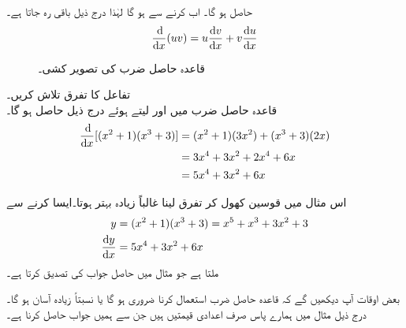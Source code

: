 حاصل ہو گا۔ اب   کرنے سے  ہو گا لہٰذا درج ذیل باقی رہ جاتا ہے۔
\begin{align*}
\frac{\dif}{\dif x}(uv)=u\frac{\dif v}{\dif x}+v\frac{\dif u}{\dif x}
\end{align*} 
%
\begin{figure}
\centering
{}
\caption{قاعدہ حاصل ضرب کی تصویر کشی۔}
\label{شکل_تفرق_قاعدہ_ضرب_تصور_کشی}
\end{figure}

تفاعل  کا تفرق تلاش کریں۔\\
قاعدہ حاصل ضرب میں  اور  لیتے ہوئے درج ذیل حاصل ہو گا۔
\begin{align*}
\frac{\dif}{\dif x}[(x^2+1)(x^3+3)]&=(x^2+1)(3x^2)+(x^3+3)(2x)\\
&=3x^4+3x^2+2x^4+6x\\
&=5x^4+3x^2+6x
\end{align*}
 
اس مثال میں  قوسین کھول کر تفرق لینا غالباً زیادہ بہتر ہوتا۔ایسا کرنے سے
\begin{align*}
y&=(x^2+1)(x^3+3)=x^5+x^3+3x^2+3\\
\frac{\dif y}{\dif x}&=5x^4+3x^2+6x
\end{align*}
ملتا ہے جو مثال  میں حاصل جواب کی تصدیق کرتا ہے۔

بعض اوقات آپ دیکھیں گے کہ قاعدہ حاصل ضرب استعمال کرنا ضروری ہو گا یا نسبتاً زیادہ آسان ہو گا۔درج ذیل مثال میں ہمارے پاس صرف اعدادی قیمتیں ہیں جن سے ہمیں جواب حاصل کرنا ہے۔

